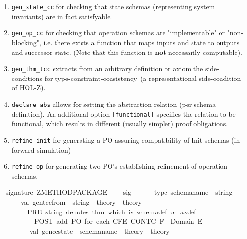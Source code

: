 \begin{isabellebody}
\begin{isamarkuptext}
  \begin{enumerate}
  \item \verb+gen_state_cc+ for checking that state schemas 
        (representing system invariants) are in fact satisfyable.
  \item \verb+gen_op_cc+ for checking that operation schemas 
        are "implementable" or "non-blocking", i.e. there exists a function
        that maps inputs and state to outputs and successor state.
        (Note that this function is \textbf{not} necessarily
        computable). 
  \item \verb+gen_thm_tcc+ extracts from an arbitrary definition
        or axiom the side-conditions for type-constraint-consistency.
        (a representational side-condition of HOL-Z).
  \item \verb+declare_abs+ allows for setting the
        abstraction relation (per schema definition).
        An additional option \verb+[functional]+ specifies
        the relation to be functional, which results in different
        (usually simpler) proof obligations.      
  \item \verb+refine_init+ for generating a PO assuring
        compatibility of Init schemas (in forward simulation)
  \item \verb+refine_op+ for generating two PO's establishing
        refinement of operation schemas.
  \end{enumerate}%
\end{isamarkuptext}%
\isamarkuptrue%
%
\isadelimML
%
\endisadelimML
%
\isatagML
{}\isamarkupfalse%
{\isacharverbatimopen}\ \isanewline
\isanewline
signature\ ZMETHOD{\isacharunderscore}PACKAGE\ {\isacharequal}\isanewline
\ \ \ sig\isanewline
\ \ \ \ \ \ type\ schema{\isacharunderscore}name\ {\isacharequal}\ string\isanewline
\isanewline
\ \ \ \ \ \ val\ gen{\isacharunderscore}tcc{\isacharunderscore}from\ {\isacharcolon}\ string\ {\isacharminus}{\isachargreater}\ theory\ {\isacharminus}{\isachargreater}\ theory\isanewline
\ \ \ \ \ \ \ {\isacharparenleft}{\isacharasterisk}\ PRE\ string\ denotes\ thm\ which\ is\ schema{\isacharunderscore}def\ or\ axdef{\isachardot}\isanewline
\ \ \ \ \ \ \ \ \ \ POST\ add\ PO\ for\ each\ C{\isacharparenleft}F{\isacharpercent}{\isacharcircum}E{\isacharparenright}{\isacharcolon}\ CONT{\isacharparenleft}C{\isacharcomma}\ F\ {\isacharcolon}\ Domain\ E{\isacharparenright}\ \ \ \ \isanewline
\ \ \ \ \ \ \ \ {\isacharasterisk}{\isacharparenright}\isanewline
\ \ \isanewline
\ \ \ \ \ \ val\ gen{\isacharunderscore}cc{\isacharunderscore}state\ {\isacharcolon}\ schema{\isacharunderscore}name\ {\isacharminus}{\isachargreater}\ theory\ {\isacharminus}{\isachargreater}\ theory\isanewline

\end{isabellebody}
